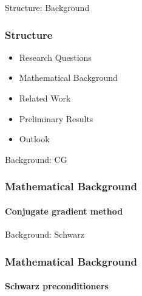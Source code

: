 \begin{frame}{Structure: Background}
    \frametitle{Structure}
    \begin{itemize}
        \item Research Questions
        \item {\color{tud grapefruit}Mathematical Background}
        \item Related Work
        \item Preliminary Results
        \item Outlook
    \end{itemize}
\end{frame}

\begin{frame}{Background: CG}
    \frametitle{Mathematical Background}
    \framesubtitle{Conjugate gradient method}
\end{frame}

\begin{frame}{Background: Schwarz}
    \frametitle{Mathematical Background}
    \framesubtitle{Schwarz preconditioners}
\end{frame}